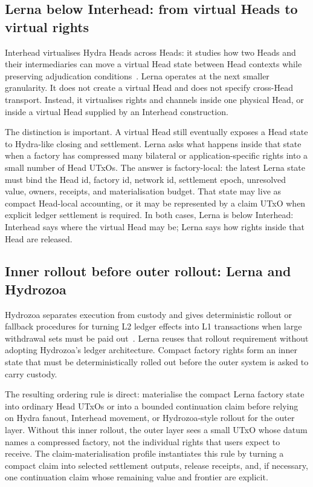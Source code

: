 \documentclass[a4paper,11pt]{article}
\theoremstyle{definition}
\theoremstyle{plain}
\theoremstyle{remark}
\begin{document}
\subsection{Lerna below Interhead: from virtual Heads to virtual rights}
\label{sec:below-interhead}

Interhead virtualises Hydra Heads across Heads: it studies how two Heads and
their intermediaries can move a virtual Head state between Head contexts while
preserving adjudication conditions~\cite{interhead}. Lerna operates at the next
smaller granularity. It does not create a virtual Head and does not specify
cross-Head transport. Instead, it virtualises rights and channels inside one
physical Head, or inside a virtual Head supplied by an Interhead construction.

The distinction is important. A virtual Head still eventually exposes a Head
state to Hydra-like closing and settlement. Lerna asks what happens inside that
state when a factory has compressed many bilateral or application-specific
rights into a small number of Head UTxOs. The answer is factory-local: the
latest Lerna state must bind the Head id, factory id, network id, settlement
epoch, unresolved value, owners, receipts, and materialisation budget. That
state may live as compact Head-local accounting, or it may be represented by a
claim UTxO when explicit ledger settlement is required. In both cases, Lerna is
below Interhead: Interhead says where the virtual Head may be; Lerna says how
rights inside that Head are released.

\subsection{Inner rollout before outer rollout: Lerna and Hydrozoa}
\label{sec:inner-rollout}

Hydrozoa separates execution from custody and gives deterministic rollout or
fallback procedures for turning L2 ledger effects into L1 transactions when
large withdrawal sets must be paid out~\cite{hydrozoa-spec}. Lerna reuses that
rollout requirement without adopting Hydrozoa's ledger architecture. Compact
factory rights form an inner state that must be deterministically rolled out
before the outer system is asked to carry custody.

The resulting ordering rule is direct: materialise the compact Lerna factory
state into ordinary Head UTxOs or into a bounded continuation claim before
relying on Hydra fanout, Interhead movement, or Hydrozoa-style rollout for the
outer layer. Without this inner rollout, the outer layer sees a small UTxO whose
datum names a compressed factory, not the individual rights that users expect to
receive. The claim-materialisation profile instantiates this rule by turning a
compact claim into selected settlement outputs, release receipts, and, if
necessary, one continuation claim whose remaining value and frontier are
explicit.
\end{document}
